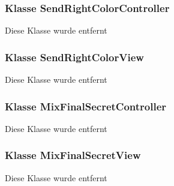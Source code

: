 \documentclass{article}
\begin{document}
	\subsubsection{Klasse SendRightColorController}
    Diese Klasse wurde entfernt

	\subsubsection{Klasse SendRightColorView}
    Diese Klasse wurde entfernt

	\subsubsection{Klasse MixFinalSecretController}
    Diese Klasse wurde entfernt

	\subsubsection{Klasse MixFinalSecretView}
    Diese Klasse wurde entfernt
	
 \restoregeometry

\glsaddall
\printglossary[numberedsection, style=altlist]
\end{document}
